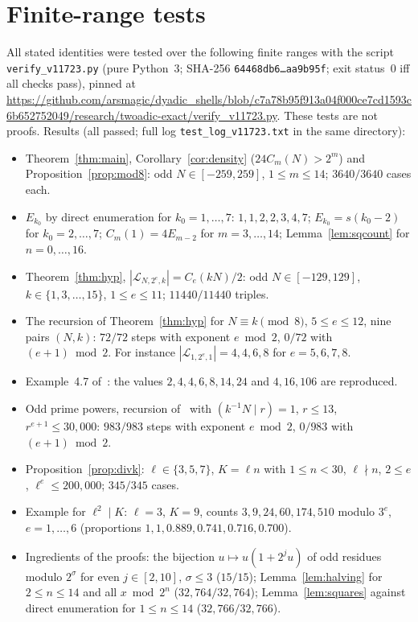 \documentclass[11pt]{amsart}
\theoremstyle{remark}
\newcommand{\Lset}{\mathcal{L}}
\begin{document}
\section{Finite-range tests}\label{sec:numerics}
All stated identities were tested over the following finite ranges with the script \texttt{verify\_v11723.py} (pure Python~3; SHA-256 \texttt{64468db6\ldots aa9b95f}; exit status~$0$ iff all checks pass), pinned at \url{https://github.com/arsmagic/dyadic_shells/blob/c7a78b95f913a04f000ce7cd1593c6b652752049/research/twoadic-exact/verify_v11723.py}. These tests are not proofs. Results (all passed; full log \texttt{test\_log\_v11723.txt} in the same directory):
\begin{itemize}
\item Theorem~\ref{thm:main}, Corollary~\ref{cor:density} ($24C_m(N)>2^m$) and Proposition~\ref{prop:mod8}: odd $N\in[-259,259]$, $1\le m\le14$; $3640/3640$ cases each.
\item $E_{k_0}$ by direct enumeration for $k_0=1,\dots,7$: $1,1,2,2,3,4,7$; $E_{k_0}=s(k_0-2)$ for $k_0=2,\dots,7$; $C_m(1)=4E_{m-2}$ for $m=3,\dots,14$; Lemma~\ref{lem:sqcount} for $n=0,\dots,16$.
\item Theorem~\ref{thm:hyp}, $|\Lset_{N,2^e,k}|=C_e(kN)/2$: odd $N\in[-129,129]$, $k\in\{1,3,\dots,15\}$, $1\le e\le11$; $11440/11440$ triples.
\item The recursion of Theorem~\ref{thm:hyp} for $N\equiv k\pmod 8$, $5\le e\le12$, nine pairs $(N,k)$: $72/72$ steps with exponent $e\bmod2$, $0/72$ with $(e+1)\bmod2$. For instance $|\Lset_{1,2^e,1}|=4,4,6,8$ for $e=5,6,7,8$.
\item Example~4.7 of~\cite{hittmeir2023}: the values $2,4,4,6,8,14,24$ and $4,16,106$ are reproduced.
\item Odd prime powers, recursion of~\cite[Theorem~3.5]{hittmeir2023} with $(k^{-1}N\mid r)=1$, $r\le13$, $r^{e+1}\le30{,}000$: $983/983$ steps with exponent $e\bmod2$, $0/983$ with $(e+1)\bmod2$.
\item Proposition~\ref{prop:divk}: $\ell\in\{3,5,7\}$, $K=\ell n$ with $1\le n<30$, $\ell\nmid n$, $2\le e$, $\ell^e\le 200{,}000$; $345/345$ cases.
\item Example for $\ell^2\mid K$: $\ell=3$, $K=9$, counts $3,9,24,60,174,510$ modulo $3^e$, $e=1,\dots,6$ (proportions $1,1,0.889,0.741,0.716,0.700$).
\item Ingredients of the proofs: the bijection $u\mapsto u(1+2^ju)$ of odd residues modulo $2^\sigma$ for even $j\in[2,10]$, $\sigma\le3$ ($15/15$); Lemma~\ref{lem:halving} for $2\le n\le14$ and all $x\bmod 2^n$ ($32{,}764/32{,}764$); Lemma~\ref{lem:squares} against direct enumeration for $1\le n\le14$ ($32{,}766/32{,}766$).
\end{itemize}
\end{document}
